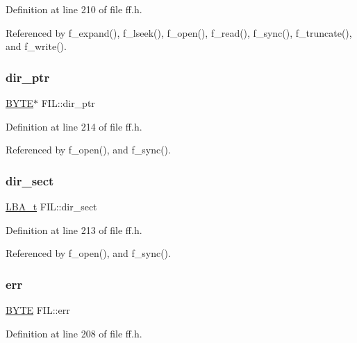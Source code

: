 Definition at line 210 of file ff.\+h.



Referenced by f\+\_\+expand(), f\+\_\+lseek(), f\+\_\+open(), f\+\_\+read(), f\+\_\+sync(), f\+\_\+truncate(), and f\+\_\+write().

\mbox{\label{structFIL_a5af9e9fb312b629220eaf684dd28c4a9}} 
\subsubsection{\texorpdfstring{dir\+\_\+ptr}{dir\_ptr}}
{\footnotesize\ttfamily \hyperlink{ff_8h_a4ae1dab0fb4b072a66584546209e7d58}{B\+Y\+TE}$\ast$ F\+I\+L\+::dir\+\_\+ptr}



Definition at line 214 of file ff.\+h.



Referenced by f\+\_\+open(), and f\+\_\+sync().

\mbox{\label{structFIL_a19e61b116df8e6f2138243998e43f131}} 
\subsubsection{\texorpdfstring{dir\+\_\+sect}{dir\_sect}}
{\footnotesize\ttfamily \hyperlink{ff_8h_a1f3c30a83148a28340f009d4e583f087}{L\+B\+A\+\_\+t} F\+I\+L\+::dir\+\_\+sect}



Definition at line 213 of file ff.\+h.



Referenced by f\+\_\+open(), and f\+\_\+sync().

\mbox{\label{structFIL_aea440945db26de9c4a88065c0c887fda}} 
\subsubsection{\texorpdfstring{err}{err}}
{\footnotesize\ttfamily \hyperlink{ff_8h_a4ae1dab0fb4b072a66584546209e7d58}{B\+Y\+TE} F\+I\+L\+::err}



Definition at line 208 of file ff.\+h.




